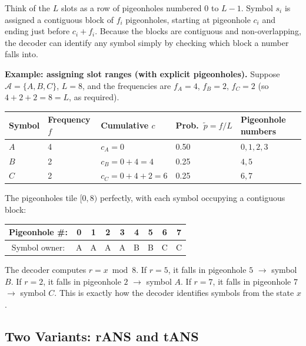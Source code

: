 Think of the $L$ slots as a row of pigeonholes numbered $0$
to $L-1$.  Symbol $s_i$ is assigned a contiguous block of
$f_i$ pigeonholes, starting at pigeonhole $c_i$ and ending
just before $c_i + f_i$.  Because the blocks are contiguous
and non-overlapping, the decoder can identify any symbol
simply by checking which block a number falls into.


\begin{examplebox}
\textbf{Example: assigning slot ranges (with explicit pigeonholes).}
Suppose $\mathcal{A} = \{A, B, C\}$, $L = 8$, and the
frequencies are $f_A = 4$, $f_B = 2$, $f_C = 2$
(so $4+2+2=8=L$, as required).

\medskip
\begin{center}
\begin{tabular}{@{}lllll@{}}
\toprule
Symbol & Frequency $f$ & Cumulative $c$ & Prob.\ $\tilde{p}=f/L$
  & Pigeonhole numbers \\
\midrule
$A$ & 4 & $c_A=0$         & 0.50 & $0, 1, 2, 3$ \\
$B$ & 2 & $c_B=0+4=4$     & 0.25 & $4, 5$ \\
$C$ & 2 & $c_C=0+4+2=6$   & 0.25 & $6, 7$ \\
\bottomrule
\end{tabular}
\end{center}

\medskip
\noindent
The pigeonholes tile $[0,8)$ perfectly, with each symbol
occupying a contiguous block:

\medskip
\begin{center}
\ttfamily
\begin{tabular}{ccccccccc}
\toprule
Pigeonhole \#: & 0 & 1 & 2 & 3 & 4 & 5 & 6 & 7 \\
\midrule
Symbol owner:  & A & A & A & A & B & B & C & C \\
\bottomrule
\end{tabular}
\end{center}

\medskip
\noindent
The decoder computes $r = x \bmod 8$.  
If $r = 5$, it falls in pigeonhole $5$ $\rightarrow$ symbol $B$.  
If $r = 2$, it falls in pigeonhole $2$ $\rightarrow$ symbol $A$.  
If $r = 7$, it falls in pigeonhole $7$ $\rightarrow$ symbol $C$.  
This is exactly how the decoder identifies symbols from the state $x$.
\end{examplebox}


\subsection{Two Variants: rANS and tANS}

